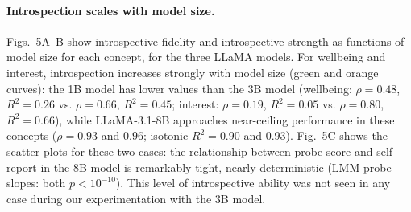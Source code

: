 \documentclass[10pt]{article}
\begin{document}
\paragraph{Introspection scales with model size.}
Figs.~5A--B show introspective fidelity and introspective strength as functions of model size for each concept, for the three LLaMA models.
For wellbeing and interest, introspection increases strongly with model size (green and orange curves): the 1B model has lower values than the 3B model (wellbeing: $\rho = 0.48$, $R^2 = 0.26$ vs. $\rho = 0.66$, $R^2 = 0.45$; interest: $\rho = 0.19$, $R^2 = 0.05$ vs. $\rho = 0.80$, $R^2 = 0.66$), while LLaMA-3.1-8B approaches near-ceiling performance in these concepts ($\rho = 0.93$ and $0.96$; isotonic $R^2 = 0.90$ and $0.93$).
Fig.~5C shows the scatter plots for these two cases: the relationship between probe score and self-report in the 8B model is remarkably tight, nearly deterministic (LMM probe slopes: both $p < 10^{-10}$). This level of introspective ability was not seen in any case during our experimentation with the 3B model.
\end{document}
